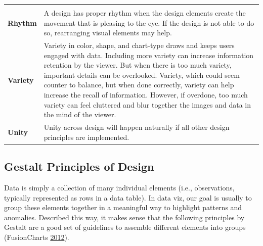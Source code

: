 \documentclass[]{book}
\theoremstyle{definition}
\theoremstyle{definition}
\theoremstyle{definition}
\theoremstyle{remark}
\begin{document}
\begin{longtable}[]{@{}ll@{}}
\begin{minipage}[t]{0.78\columnwidth}
\end{minipage}\tabularnewline
\begin{minipage}[t]{0.16\columnwidth}\raggedright\strut
\textbf{Rhythm}\strut
\end{minipage} & \begin{minipage}[t]{0.78\columnwidth}\raggedright\strut
A design has proper rhythm when the design elements create the movement
that is pleasing to the eye. If the design is not able to do so,
rearranging visual elements may help.\strut
\end{minipage}\tabularnewline
\begin{minipage}[t]{0.16\columnwidth}\raggedright\strut
\textbf{Variety}\strut
\end{minipage} & \begin{minipage}[t]{0.78\columnwidth}\raggedright\strut
Variety in color, shape, and chart-type draws and keeps users engaged
with data. Including more variety can increase information retention by
the viewer. But when there is too much variety, important details can be
overlooked. Variety, which could seem counter to balance, but when done
correctly, variety can help increase the recall of information. However,
if overdone, too much variety can feel cluttered and blur together the
images and data in the mind of the viewer.\strut
\end{minipage}\tabularnewline
\begin{minipage}[t]{0.16\columnwidth}\raggedright\strut
\textbf{Unity}\strut
\end{minipage} & \begin{minipage}[t]{0.78\columnwidth}\raggedright\strut
Unity across design will happen naturally if all other design principles
are implemented.\strut
\end{minipage}\tabularnewline
\bottomrule
\end{longtable}

\subsection{Gestalt Principles of
Design}\label{gestalt-principles-of-design}

Data is simply a collection of many individual elements (i.e.,
observations, typically represented as rows in a data table). In data
viz, our goal is usually to group these elements together in a
meaningful way to highlight patterns and anomalies. Described this way,
it makes sense that the following principles by Gestalt are a good set
of guidelines to assemble different elements into groups (FusionCharts
\protect\hyperlink{ref-principles-fusioncharts}{2012}).
\end{document}
